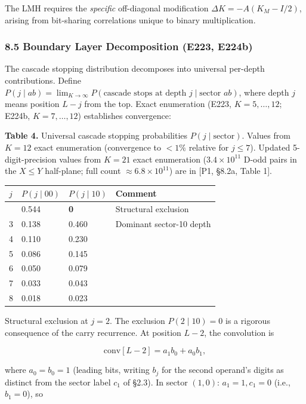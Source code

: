 \documentclass[
  11pt,
]{article}
\begin{document}
The LMH requires the \emph{specific} off-diagonal modification
\(\Delta K = -A(K_M - I/2)\), arising from bit-sharing correlations unique to
binary multiplication.

\subsubsection{8.5 Boundary Layer Decomposition (E223,
E224b)}\label{boundary-layer-decomposition-e223-e224b}

The cascade stopping distribution decomposes into universal per-depth
contributions. Define
\(P(j \mid ab) = \lim_{K \to \infty} P(\text{cascade stops at depth } j \mid \text{sector } ab)\),
where depth \(j\) means position \(L - j\) from the top. Exact enumeration
(E223, \(K = 5, \ldots, 12\); E224b, \(K = 7, \ldots, 12\)) establishes
convergence:

\textbf{Table 4.} Universal cascade stopping probabilities
\(P(j \mid \mathrm{sector})\). Values from \(K = 12\) exact enumeration
(convergence to \(<1\%\) relative for \(j \leq 7\)). Updated 5-digit-precision
values from \(K = 21\) exact enumeration (\(3.4 \times 10^{11}\) D-odd pairs in
the \(X \leq Y\) half-plane; full count \(\approx 6.8 \times 10^{11}\)) are in
{[}P1, §8.2a, Table 1{]}.

\begin{longtable}[]{@{}llll@{}}
\toprule\noalign{}
\(j\) & \(P(j \mid 00)\) & \(P(j \mid 10)\) & Comment \\
\midrule\noalign{}
\endhead
\bottomrule\noalign{}
\endlastfoot
2 & 0.544 & \textbf{0} & Structural exclusion \\
3 & 0.138 & 0.460 & Dominant sector-10 depth \\
4 & 0.110 & 0.230 & \\
5 & 0.086 & 0.145 & \\
6 & 0.050 & 0.079 & \\
7 & 0.033 & 0.043 & \\
8 & 0.018 & 0.023 & \\
\end{longtable}

Structural exclusion at \(j = 2\). The exclusion \(P(2 \mid 10) = 0\) is a
rigorous consequence of the carry recurrence. At position \(L-2\), the
convolution is

\[\mathrm{conv}[L-2] = a_1 b_0 + a_0 b_1,\]

where \(a_0 = b_0 = 1\) (leading bits, writing \(b_j\) for the second operand's
digits as distinct from the sector label \(c_1\) of §2.3). In sector \((1,0)\):
\(a_1 = 1, c_1 = 0\) (i.e., \(b_1 = 0\)), so
\end{document}
